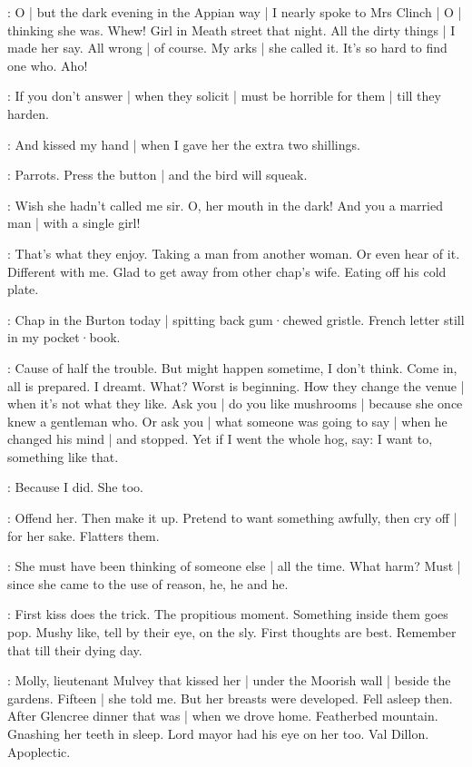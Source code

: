 \BloomHist:
O |
but the dark evening in the Appian way |
I nearly spoke to Mrs Clinch |
O |
thinking she was.
Whew!
Girl in Meath street that night.
All the dirty things |
I made her say.
All wrong |
of course.
My arks |
she called it.
It's so hard to find one who.
Aho!

\BloomAbstract:
If you don't answer |
when they solicit |
must be horrible for them |%
till they harden.

\BloomHist:
And kissed my hand |
when I gave her the extra two shillings.

\BloomAbstract:
Parrots.
Press the button |
and the bird will squeak.

\BloomHist:
Wish she hadn't called me sir.
O,
her mouth in the dark!
And you a married man |
with a single girl!

\BloomAbstract:
That's what they enjoy.
Taking a man from another woman.
Or even hear of it.
Different with me.
Glad to get away from other chap's wife.
Eating off his cold plate.

\BloomToday:
Chap in the Burton today |
spitting back gum·chewed gristle.
French letter still in my pocket·book.

\BloomAbstract:
Cause of half the trouble.
But might happen sometime,
I don't think.
Come in,
all is prepared.
I dreamt.
What?
Worst is beginning.
How they change the venue |
when it's not what they like.%
Ask you |
do you like mushrooms |
because she once knew a gentleman who.
Or ask you |
what someone was going to say |
when he changed his mind |
and stopped.
Yet if I went the whole hog,
say:
I want to,
something like that.

\BloomCurrent:
Because I did.
She too.

\BloomAbstract:
Offend her.
Then make it up.
Pretend to want something awfully,
then cry off |
for her sake.
Flatters them.

\BloomCurrent:
She must have been thinking of someone else |
all the time.
What harm?
Must |
since she came to the use of reason,
he,
he and he.

\BloomAbstract:
First kiss does the trick.
The propitious moment.
Something inside them goes pop.
Mushy like,
tell by their eye,
on the sly.
First thoughts are best.
Remember that
till their dying day.

\BloomHist:
Molly,
lieutenant Mulvey that kissed her |
under the Moorish wall |
beside the gardens.%
Fifteen |
she told me.
But her breasts were developed.
Fell asleep then.
After Glencree dinner that was |
when we drove home.
Featherbed mountain.
Gnashing her teeth in sleep.
Lord mayor had his eye on her too.
Val Dillon.
Apoplectic.

